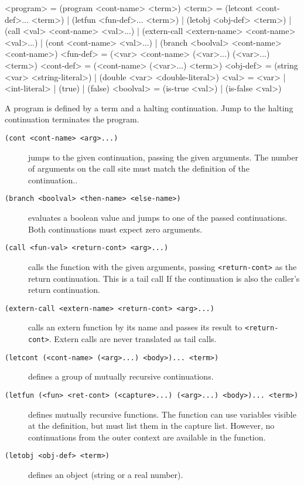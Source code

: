 \begin{gram}
<program>   = (program <cont-name> <term>)
<term>      = (letcont <cont-def>... <term>)
            | (letfun <fun-def>... <term>)
            | (letobj <obj-def> <term>)
            | (call <val> <cont-name> <val>...)
            | (extern-call <extern-name> <cont-name> <val>...)
            | (cont <cont-name> <val>...)
            | (branch <boolval> <cont-name> <cont-name>)
<fun-def>   = (<var> <cont-name> (<var>...) (<var>...) <term>)
<cont-def>  = (<cont-name> (<var>...) <term>)
<obj-def>   = (string <var> <string-literal>)
            | (double <var> <double-literal>)
<val>       = <var> | <int-literal> | (true) | (false)
<boolval>   = (is-true <val>) | (is-false <val>)
\end{gram}

A program is defined by a term and a halting continuation. Jump to the halting
continuation terminates the program.

\begin{description}
\item[\texttt{(cont <cont-name> <arg>...)}] jumps to the given continuation,
  passing the given arguments. The number of arguments on the call site must
  match the definition of the continuation..

\item[\texttt{(branch <boolval> <then-name> <else-name>)}] evaluates a boolean
  value and jumps to one of the passed continuations. Both continuations must
  expect zero arguments.

\item[\texttt{(call <fun-val> <return-cont> <arg>...)}] calls the function with
  the given arguments, passing \texttt{<return-cont>} as the return
  continuation. This is a tail call If the continuation is also the caller's
  return continuation.

\item[\texttt{(extern-call <extern-name> <return-cont> <arg>...)}] calls an
  extern function by its name and passes its result to \texttt{<return-cont>}.
  Extern calls are never translated as tail calls.

\item[\texttt{(letcont (<cont-name> (<arg>...) <body>)... <term>)}] defines
  a group of mutually recursive continuations.

\item[\texttt{(letfun (<fun> <ret-cont> (<capture>...) (<arg>...) <body>)...
  <term>)}] defines mutually recursive functions. The function can use variables
  visible at the definition, but must list them in the capture list.
  However, no continuations from the outer context are available in the
  function.

\item[\texttt{(letobj <obj-def> <term>)}] defines an object (string or a real
  number).
\end{description}

